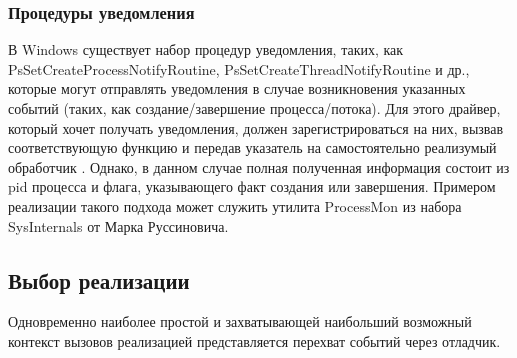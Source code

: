 \subsubsection {Процедуры уведомления}
В Windows существует набор процедур уведомления, таких, как\\
PsSetCreateProcessNotifyRoutine, PsSetCreateThreadNotifyRoutine и др., которые могут отправлять уведомления в случае возникновения указанных событий (таких, как создание/завершение процесса/потока). Для этого драйвер, который хочет получать уведомления, должен зарегистрироваться на них, вызвав соответствующую функцию и передав указатель на самостоятельно реализумый обработчик . Однако, в данном случае полная полученная информация состоит из pid процесса и флага, указывающего факт создания или завершения. Примером реализации такого подхода может служить утилита ProcessMon из набора SysInternals от Марка Руссиновича.
\subsection {Выбор реализации}
Одновременно наиболее простой и захватывающей наибольший возможный контекст вызовов реализацией представляется перехват событий через отладчик.

